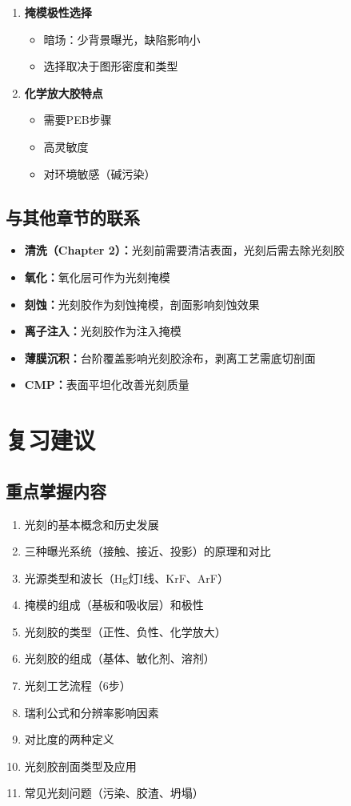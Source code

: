 \documentclass[UTF8,12pt,a4paper]{ctexart}
\begin{document}
\begin{enumerate}
    \item \textbf{掩模极性选择}
    \begin{itemize}
        \item 暗场：少背景曝光，缺陷影响小
        \item 选择取决于图形密度和类型
    \end{itemize}
    
    \item \textbf{化学放大胶特点}
    \begin{itemize}
        \item 需要PEB步骤
        \item 高灵敏度
        \item 对环境敏感（碱污染）
    \end{itemize}
\end{enumerate}

\subsection{与其他章节的联系}

\begin{itemize}
    \item \textbf{清洗（Chapter 2）：}光刻前需要清洁表面，光刻后需去除光刻胶
    \item \textbf{氧化：}氧化层可作为光刻掩模
    \item \textbf{刻蚀：}光刻胶作为刻蚀掩模，剖面影响刻蚀效果
    \item \textbf{离子注入：}光刻胶作为注入掩模
    \item \textbf{薄膜沉积：}台阶覆盖影响光刻胶涂布，剥离工艺需底切剖面
    \item \textbf{CMP：}表面平坦化改善光刻质量
\end{itemize}

\section{复习建议}

\subsection{重点掌握内容}

\begin{enumerate}
    \item 光刻的基本概念和历史发展
    \item 三种曝光系统（接触、接近、投影）的原理和对比
    \item 光源类型和波长（Hg灯I线、KrF、ArF）
    \item 掩模的组成（基板和吸收层）和极性
    \item 光刻胶的类型（正性、负性、化学放大）
    \item 光刻胶的组成（基体、敏化剂、溶剂）
    \item 光刻工艺流程（6步）
    \item 瑞利公式和分辨率影响因素
    \item 对比度的两种定义
    \item 光刻胶剖面类型及应用
    \item 常见光刻问题（污染、胶渣、坍塌）
\end{enumerate}
\end{document}
